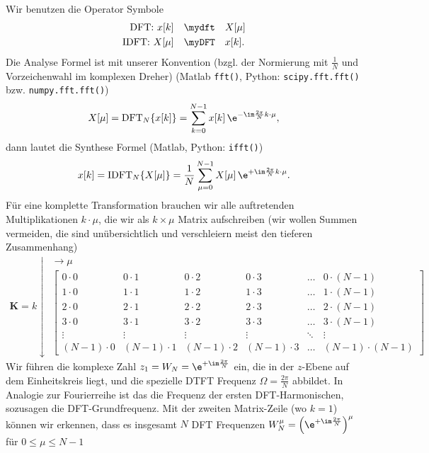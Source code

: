 Wir benutzen die Operator Symbole
\begin{align}
\text{DFT: }x[k] &\quad\mydft\quad X[\mu]\\
\text{IDFT: }X[\mu] &\quad\myDFT\quad x[k].
\end{align}
%
Die Analyse Formel ist mit unserer Konvention
(bzgl. der Normierung mit $\frac{1}{N}$ und Vorzeichenwahl im komplexen Dreher)
(Matlab \texttt{fft()}, Python: \texttt{scipy.fft.fft()} bzw. \texttt{numpy.fft.fft()})
\begin{align}
X[\mu] = \mathrm{DFT}_N\{x[k]\} = \sum_{k=0}^{N-1} x[k] \, \e^{-\im\frac{2\pi}{N} k \cdot \mu},
\end{align}
dann lautet die Synthese Formel (Matlab, Python: \texttt{ifft()})
\begin{align}
x[k] = \mathrm{IDFT}_N\{X[\mu]\} = \frac{1}{N} \sum_{\mu=0}^{N-1} X[\mu] \, \e^{+\im\frac{2\pi}{N} k \cdot \mu}.
\end{align}
%
Für eine komplette Transformation brauchen wir alle auftretenden Multiplikationen $k \cdot \mu$,
die wir als $k \times \mu$ Matrix aufschreiben (wir wollen Summen vermeiden,
die sind unübersichtlich und verschleiern meist den tieferen Zusammenhang)
\begin{align}
\bm{K} =
k \downarrow
\substack{\rightarrow \mu\\
\begin{bmatrix}
0 \cdot 0 & 0 \cdot 1 & 0 \cdot 2 & 0 \cdot 3 & \dots & 0 \cdot (N-1)\\
1 \cdot 0 & 1 \cdot 1 & 1 \cdot 2 & 1 \cdot 3 & \dots & 1 \cdot (N-1)\\
2 \cdot 0 & 2 \cdot 1 & 2 \cdot 2 & 2 \cdot 3 & \dots & 2 \cdot (N-1)\\
3 \cdot 0 & 3 \cdot 1 & 3 \cdot 2 & 3 \cdot 3 & \dots & 3 \cdot (N-1)\\
\vdots & \vdots & \vdots & \vdots & \ddots & \vdots\\
(N-1) \cdot 0 & (N-1) \cdot 1 & (N-1) \cdot 2 & (N-1) \cdot 3 & \dots &  (N-1) \cdot (N-1)
\end{bmatrix}
}
\end{align}
Wir führen die komplexe Zahl $z_1 = W_N = \e^{+\im\frac{2\pi}{N}}$ ein, die
in der $z$-Ebene auf dem Einheitskreis liegt, und die spezielle DTFT
Frequenz $\Omega = \frac{2\pi}{N}$ abbildet. In Analogie zur Fourierreihe ist
das die Frequenz der ersten DFT-Harmonischen, sozusagen die DFT-Grundfrequenz.
Mit der zweiten Matrix-Zeile (wo $k=1$) können wir erkennen,
dass es insgesamt $N$ DFT Frequenzen
$W_N^\mu=\left(\e^{+\im\frac{2\pi}{N}}\right)^\mu$ für $0\leq\mu\leq N-1$
